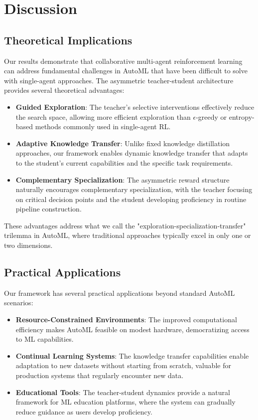 \documentclass[twoside,11pt]{article}
\begin{document}
\section{Discussion}

\subsection{Theoretical Implications}

Our results demonstrate that collaborative multi-agent reinforcement learning can address fundamental challenges in AutoML that have been difficult to solve with single-agent approaches. The asymmetric teacher-student architecture provides several theoretical advantages:

\begin{itemize}
    \item \textbf{Guided Exploration}: The teacher's selective interventions effectively reduce the search space, allowing more efficient exploration than $\epsilon$-greedy or entropy-based methods commonly used in single-agent RL.
    
    \item \textbf{Adaptive Knowledge Transfer}: Unlike fixed knowledge distillation approaches, our framework enables dynamic knowledge transfer that adapts to the student's current capabilities and the specific task requirements.
    
    \item \textbf{Complementary Specialization}: The asymmetric reward structure naturally encourages complementary specialization, with the teacher focusing on critical decision points and the student developing proficiency in routine pipeline construction.
\end{itemize}

These advantages address what we call the "exploration-specialization-transfer" trilemma in AutoML, where traditional approaches typically excel in only one or two dimensions.

\subsection{Practical Applications}

Our framework has several practical applications beyond standard AutoML scenarios:

\begin{itemize}
    \item \textbf{Resource-Constrained Environments}: The improved computational efficiency makes AutoML feasible on modest hardware, democratizing access to ML capabilities.
    
    \item \textbf{Continual Learning Systems}: The knowledge transfer capabilities enable adaptation to new datasets without starting from scratch, valuable for production systems that regularly encounter new data.
    
    \item \textbf{Educational Tools}: The teacher-student dynamics provide a natural framework for ML education platforms, where the system can gradually reduce guidance as users develop proficiency.
\end{itemize}
\end{document}
